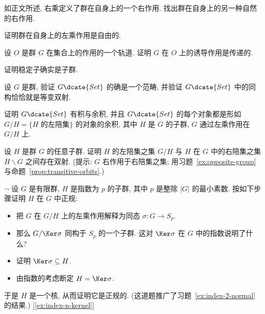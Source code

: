 \begin{prob}
\label{ex:right-action}
如正文所述, 右乘定义了群在自身上的一个右作用. 找出群在自身上的另一种自然的右作用.
\end{prob}

\begin{prob}
\label{ex:free-action}
证明群在自身上的左乘作用是自由的.
\end{prob}

\begin{prob}
\label{ex:orbit-transitive}
设 $O$ 是群 $G$ 在集合上的作用的一个轨道. 证明 $G$ 在 $O$ 上的诱导作用是传递的.
\end{prob}

\begin{prob}
\label{ex:stabilizer-subgroup}
证明稳定子确实是子群.
\end{prob}

\begin{prob}
\label{ex:GSet-category}
设 $G$ 是群, 验证 $G\dcate{Set}$ 的确是一个范畴, 并验证 $G\dcate{Set}$ 中的同构恰恰就是等变双射.
\end{prob}

\begin{prob}
\label{ex:GSet-products}
证明 $G\dcate{Set}$ 有积与余积, 并且 $G\dcate{Set}$ 的每个对象都是形如 $G/H = \{H \text{ 的左陪集}\}$ 的对象的余积, 其中 $H$ 是 $G$ 的子群, $G$ 通过左乘作用在 $G/H$ 上.
\end{prob}

\begin{prob}
\label{ex:left-right-bijection}
设 $H$ 是群 $G$ 的任意子群. 证明 $H$ 的左陪集之集 $G/H$ 与 $H$ 在 $G$ 中的右陪集之集 $H \backslash G$ 之间存在双射. (提示: $G$ 右作用于右陪集之集; 用习题~\ref{ex:opposite-group} 与命题~\ref{prop:transitive-orbits}.)
\end{prob}

\begin{prob}
\label{ex:index-p-normal}
$\neg$ 设 $G$ 是有限群, $H$ 是指数为 $p$ 的子群, 其中 $p$ 是整除 $|G|$ 的最小素数. 按如下步骤证明 $H$ 在 $G$ 中正规:
\begin{itemize}
	\item 把 $G$ 在 $G/H$ 上的左乘作用解释为同态 $\sigma : G \to S_p$.
	\item 那么 $G/\Ker \sigma$ 同构于 $S_p$ 的一个子群. 这对 $\Ker \sigma$ 在 $G$ 中的指数说明了什么?
	\item 证明 $\Ker \sigma \subseteq H$.
	\item 由指数的考虑断定 $H = \Ker \sigma$.
\end{itemize}
于是 $H$ 是一个核, 从而证明它是正规的. (这道题推广了习题~\ref{ex:index-2-normal} 的结果.) [\ref{ex:index-n-kernel}]
\end{prob}

